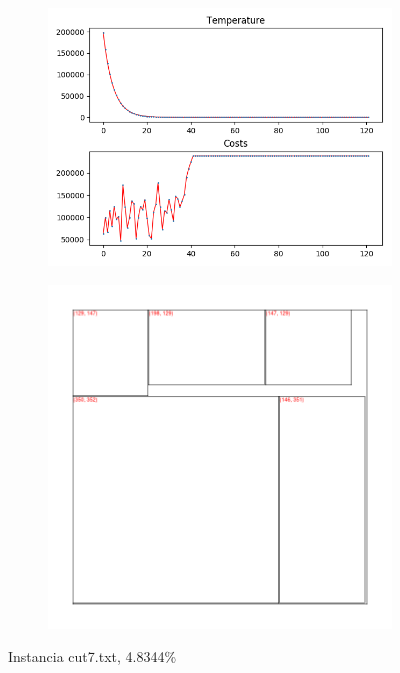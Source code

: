 \begin{figure}
\centering
\begin{subfigure}{.5\textwidth}
  \centering
  \includegraphics[width=1\linewidth]{results/cut7/2/plot}
  \label{fig:sub1}
\end{subfigure}%
\begin{subfigure}{.5\textwidth}
  \centering
  \includegraphics[width=1\linewidth]{results/cut7/2/cut}
  \label{fig:sub2}
\end{subfigure}
\caption{Instancia cut7.txt, 4.8344\%}
\label{fig:test}
\end{figure}


